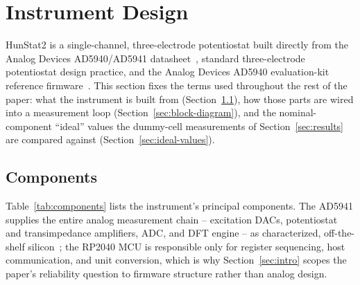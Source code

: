 \section{Instrument Design}
\label{sec:instrument-design}

HunStat2 is a single-channel, three-electrode potentiostat built directly
from the Analog Devices AD5940/AD5941 datasheet~\cite{devices2024ad5940},
standard three-electrode potentiostat design practice, and the Analog
Devices AD5940 evaluation-kit reference firmware~\cite{ad5940_eis_github}.
This section fixes the terms used throughout the rest of the paper: what
the instrument is built from (Section~\ref{sec:components}), how those parts
are wired into a measurement loop (Section~\ref{sec:block-diagram}), and the
nominal-component ``ideal'' values the dummy-cell measurements of
Section~\ref{sec:results} are compared against
(Section~\ref{sec:ideal-values}).

\subsection{Components}
\label{sec:components}
Table~\ref{tab:components} lists the instrument's principal components. The
AD5941 supplies the entire analog measurement chain -- excitation DACs,
potentiostat and transimpedance amplifiers, ADC, and DFT engine -- as
characterized, off-the-shelf silicon~\cite{devices2024ad5940}; the RP2040
MCU is responsible only for register sequencing, host communication, and
unit conversion, which is why Section~\ref{sec:intro} scopes the paper's
reliability question to firmware structure rather than analog design.

